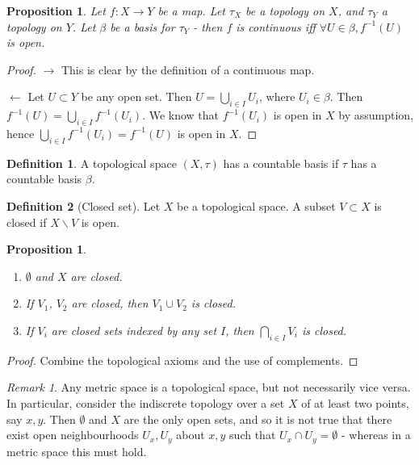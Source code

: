 \documentclass{article}
\theoremstyle{definition}
\newtheorem{defn}{Definition}[section]
\theoremstyle{plain}%
\newtheorem{prop}[thm]{Proposition}
\theoremstyle{remark}
\newtheorem*{rem}{Remark}
\newcommand{\union}{\cup}
\newcommand{\Union}{\bigcup}
\newcommand{\intersection}{\cap}
\newcommand{\Intersection}{\bigcap}
\begin{document}
\begin{prop}
Let $f: X \to Y$ be a map. Let $\tau_X$ be a topology on $X$, and $\tau_Y$ a topology on $Y$. Let $\beta$ be a basis for $\tau_Y$ - then $f$ is continuous iff $\forall U \in \beta, f^{-1}(U)$ is open. 
\end{prop}

\begin{proof}
$\rightarrow$ This is clear by the definition of a continuous map.

$\leftarrow$ Let $U \subset Y$ be any open set. Then $U = \Union_{i \in I} U_i$, where $U_i \in \beta$. Then $f^{-1}(U) = \Union_{i \in I} f^{-1}(U_i)$. We know that $f^{-1}(U_i)$ is open in $X$ by assumption, hence $\Union_{i \in I}f^{-1}(U_i) = f^{-1}(U)$ is open in $X$.
\end{proof}

\begin{defn}
A topological space $(X, \tau)$ has a countable basis if $\tau$ has a countable basis $\beta$.
\end{defn}

\begin{defn}[Closed set]
Let $X$ be a topological space. A subset $V \subset X$ is closed if $X \backslash V$ is open.
\end{defn}

\begin{prop}
\begin{enumerate}
    \item $\emptyset$ and $X$ are closed.
    \item If $V_1$, $V_2$ are closed, then $V_1 \union V_2$ is closed.
    \item If $V_i$ are closed sets indexed by any set $I$, then $\Intersection_{i \in I} V_i$ is closed.
\end{enumerate}
\end{prop}

\begin{proof}
Combine the topological axioms and the use of complements.
\end{proof}

\begin{rem}
    Any metric space is a topological space, but not necessarily vice versa. In particular, consider the indiscrete topology over a set $X$ of at least two points, say $x, y$. Then $\emptyset$ and $X$ are the only open sets, and so it is not true that there exist open neighbourhoods $U_x, U_y$ about $x, y$ such that $U_x \intersection U_y = \emptyset$ - whereas in a metric space this must hold.
\end{rem}
\end{document}
